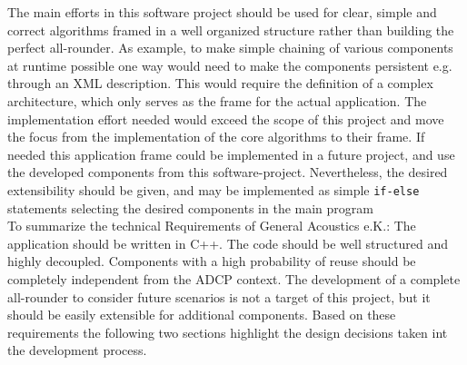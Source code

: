 The main efforts in this software project should be used for clear, simple and correct algorithms framed in a well organized structure rather than building the perfect all-rounder. As example, to make simple chaining of various components at runtime possible one way would need to make the components persistent e.g. through an XML description. This would require the definition of a complex architecture, which only serves as the frame for the actual application. The implementation  effort needed would exceed the scope of this project and move the focus from the implementation of the core algorithms to their frame. If needed this application frame could be implemented in a future project, and use the developed components from this software-project. Nevertheless, the desired extensibility should be given, and may be implemented as simple \texttt{if-else} statements selecting the desired components in the main program\\ 
To summarize the technical Requirements of General Acoustics e.K.: The application should be written in C++. The code should be well structured and highly decoupled. Components with a high probability of reuse should be completely independent from the ADCP context. The development of a complete all-rounder to consider future scenarios is not a target of this project, but it should be easily extensible for additional components. Based on these requirements the following two sections highlight the design decisions taken int the development process. 

